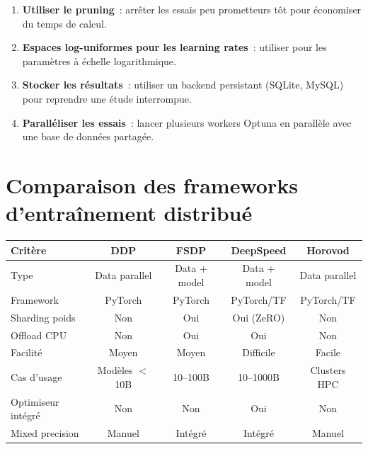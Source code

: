 \begin{bonnepratique}[title=\textbf{Bonnes pratiques Optuna}]
\begin{enumerate}
  \item \textbf{Utiliser le pruning}~: arr\^eter les essais peu prometteurs
    t\^ot pour \'economiser du temps de calcul.
  \item \textbf{Espaces log-uniformes pour les learning rates}~: utiliser
     pour les param\`etres \`a \'echelle
    logarithmique.
  \item \textbf{Stocker les r\'esultats}~: utiliser un backend persistant
    (SQLite, MySQL) pour reprendre une \'etude interrompue.
  \item \textbf{Parall\'eliser les essais}~: lancer plusieurs workers
    Optuna en parall\`ele avec une base de donn\'ees partag\'ee.
\end{enumerate}
\end{bonnepratique}

\section{Comparaison des frameworks d'entra\^inement distribu\'e}
\label{sec:distributed-comparison}

\begin{center}
\begin{tabular}{@{}lcccc@{}}
\toprule
\textbf{Crit\`ere} & \textbf{DDP} & \textbf{FSDP} &
  \textbf{DeepSpeed} & \textbf{Horovod} \\
\midrule
Type & Data parallel & Data + model & Data + model & Data parallel \\
Framework & PyTorch & PyTorch & PyTorch/TF & PyTorch/TF \\
Sharding poids & Non & Oui & Oui (ZeRO) & Non \\
Offload CPU & Non & Oui & Oui & Non \\
Facilit\'e & Moyen & Moyen & Difficile & Facile \\
Cas d'usage & Mod\`eles $<$10B & 10--100B & 10--1000B & Clusters HPC \\
Optimiseur int\'egr\'e & Non & Non & Oui & Non \\
Mixed precision & Manuel & Int\'egr\'e & Int\'egr\'e & Manuel \\
\bottomrule
\end{tabular}
\end{center}

